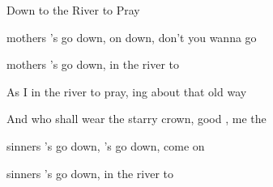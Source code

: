 \begin{SBSong}{Down to the River to Pray}
\begin{SBVerse}
     mothers 's go down,  on down, don't you wanna go 

     mothers 's go down,  in the river to  
  \end{SBVerse}
  \begin{SBVerse}
    As I  in the river to pray, ing about that  old way
    
    And who shall wear the starry crown, good , \WBLineBrk {} me the 
    
     sinners 's go down, 's go down, come on 
    
     sinners 's go down,  in the river to  
  \end{SBVerse}
\end{SBSong}

